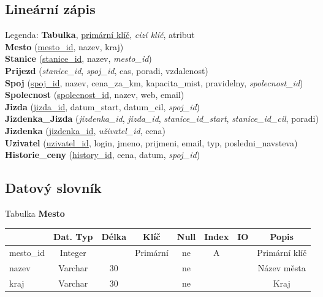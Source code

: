 \documentclass[11pt]{article}
\begin{document}
\subsection{Lineární zápis}
Legenda: \textbf{Tabulka}, \underline{primární klíč}, \textit{cizí klíč}, atribut\\
\noindent
\textbf{Mesto} (\underline{mesto\_id}, nazev, kraj)\\
\textbf{Stanice} (\underline{stanice\_id}, nazev, \textit{mesto\_id})\\
\textbf{Prijezd} (\textit{stanice\_id}, \textit{spoj\_id}, cas, poradi, vzdalenost)\\
\textbf{Spoj} (\underline{spoj\_id}, nazev, cena\_za\_km, kapacita\_mist, pravidelny, \textit{spolecnost\_id})\\
\textbf{Spolecnost} (\underline{spolecnost\_id}, nazev, web, email)\\
\textbf{Jizda} (\underline{jizda\_id}, datum\_start, datum\_cil, \textit{spoj\_id})\\
\textbf{Jizdenka\_Jizda} (\textit{jizdenka\_id}, \textit{jizda\_id}, \textit{stanice\_id\_start}, \textit{stanice\_id\_cil}, poradi)\\
\textbf{Jizdenka} (\underline{jizdenka\_id}, \textit{uživatel\_id}, cena)\\
\textbf{Uzivatel} (\underline{uzivatel\_id}, login, jmeno, prijmeni, email, typ, posledni\_navsteva)\\
\textbf{Historie\_ceny} (\underline{history\_id}, cena, datum, \textit{spoj\_id})\\

\subsection{Datový slovník}

Tabulka \textbf{Mesto}

\begin{table}[H]
    \begin{tabular}{|l|c|c|c|c|c|c|c|} \hline
                & Dat. Typ  & Délka & Klíč      & Null  & Index & IO    & Popis \\ \hline
    mesto\_id   & Integer   &       & Primární  & ne    & A     &       & Primární klíč \\ \hline
    nazev       & Varchar   & 30    &           & ne    &       &       & Název města \\ \hline
    kraj        & Varchar   & 30    &           & ne    &       &       & Kraj \\ \hline
    \end{tabular}
\end{table}
\end{document}
